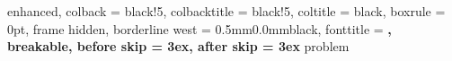 
\titlespacing*{\chapter}{0cm}{-2.0cm}{0.50cm} %
\titlespacing*{\section}{0cm}{0.50cm}{0.25cm}

\setlength{\parindent}{0pt}  %
\setlength{\parskip}{1ex}    %

%
{ enhanced,
  colback       = black!5,               %
  colbacktitle  = black!5,               %
  coltitle      = black,                  %
  boxrule       = 0pt,                    %
  frame hidden,                           %
  borderline west = {0.5mm}{0.0mm}{black},%
  fonttitle     = \bfseries\sffamily,      %
  breakable,                              %
  before skip   = 3ex,                    %
  after skip    = 3ex                     %
}{problem}

\usepackage{amssymb, latexsym, amsmath, amsthm}
\usepackage{amsfonts, rawfonts}   %
\usepackage{thmtools}             %
\usepackage{fontawesome}           %

